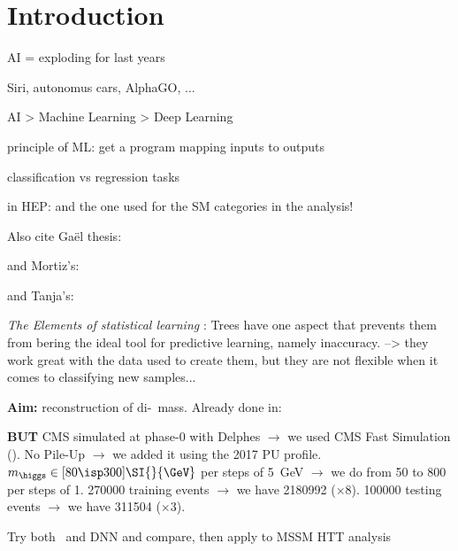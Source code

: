 \section{Introduction}\label{chapter-ML-section-intro}

AI = exploding for last years

Siri, autonomus cars, AlphaGO, ...

AI > Machine Learning > Deep Learning

principle of ML: get a program mapping inputs to outputs

classification vs regression tasks

in HEP: \cite{jet_flavor_deep_nn} and the one used for the SM categories in the analysis!

Also cite Gaël thesis:\\

and Mortiz's:\\

and Tanja's:\\

\emph{The Elements of statistical learning} : Trees have one aspect that prevents them from bering the ideal tool for predictive learning, namely inaccuracy.
--> they work great with the data used to create them, but they are not flexible when it comes to classifying new samples...

\manip \textbf{Aim:} reconstruction of di-\tau\ mass.
\submanip Already done in:\\


\manip \textbf{BUT}
\submanip CMS simulated at phase-0 with Delphes $\rightarrow$ we used CMS Fast Simulation (\FASTSIM).
\submanip No Pile-Up $\rightarrow$ we added it using the 2017 PU profile.
\submanip $m_{\higgs}\in [ 80 \isp 300 ] \SI{}{\GeV}$ per steps of \SI{5}{\GeV} $\rightarrow$ we do from 50 to 800 per steps of 1.
\submanip \num{270000} training events $\rightarrow$ we have \num{2180992} ($\times8$).
\submanip \num{100000} testing events $\rightarrow$ we have \num{311504} ($\times3$).

Try both \XGB\ and DNN and compare, then apply to MSSM HTT analysis

